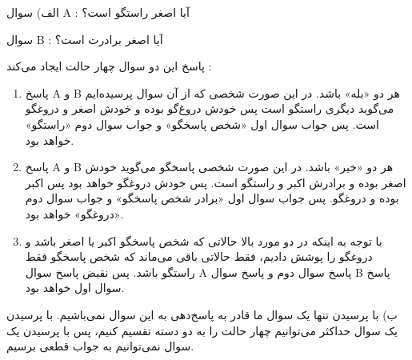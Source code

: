 \p
الف)
 سوال‌ 
        A
        : آیا اصغر راستگو است؟

        سوال 
        B
        : آیا اصغر برادرت است؟

        پاسخ این دو سوال چهار حالت ایجاد می‌کند :
        \begin{enumerate}
            \item 
            پاسخ
            A و B
            هر دو «بله» باشد. در این صورت شخصی که از آن سوال پرسیده‌ایم می‌گوید دیگری راستگو است پس خودش دروغ‌گو بوده
            و خودش اصغر و دروغگو است. پس جواب سوال اول «شخص پاسخگو» و جواب سوال دوم «راستگو» خواهد بود.
            \item 
            پاسخ
            A و B
            هر دو «خیر» باشد. در این صورت شخصی پاسخگو می‌گوید خودش اصغر بوده و برادرش اکبر و راستگو است.
            پس خودش دروغگو خواهد بود پس اکبر بوده و دروغگو. پس جواب سوال اول «برادر شخص پاسخگو» و جواب سوال دوم «دروغگو» خواهد بود.
            \item 
            با توجه به اینکه در دو مورد بالا حالاتی که شخص پاسخگو اکبر یا اصغر باشد و دروغگو را پوشش دادیم،
            فقط حالاتی باقی می‌ماند که شخص پاسخگو فقط راستگو باشد. پس نقیض پاسخ سوال
            A
            پاسخ سوال دوم و پاسخ سوال 
            B
            پاسخ سوال اول خواهد بود.
        \end{enumerate}
\p
ب) با پرسیدن تنها یک سوال ما قادر به پاسخ‌دهی به این سوال نمی‌باشیم.  با پرسیدن یک سوال حداکثر می‌توانیم چهار حالت را به دو دسته تقسیم کنیم، پس با پرسیدن یک سوال نمی‌توانیم به جواب قطعی برسیم.
